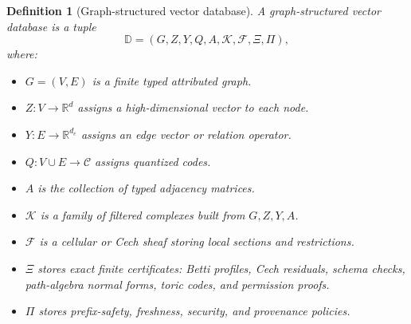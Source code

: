 \documentclass[11pt]{article}
\newtheorem{definition}[theorem]{Definition}
\newcommand{\RR}{\mathbb{R}}
\newcommand{\calK}{\mathcal{K}}
\newcommand{\calF}{\mathcal{F}}
\numberwithin{equation}{section}
\begin{document}
\begin{definition}[Graph-structured vector database]
A graph-structured vector database is a tuple
\begin{equation}
\mathbb{D}=(G,Z,Y,Q,A,\calK,\calF,\Xi,\Pi),
\end{equation}
where:
\begin{itemize}
\item $G=(V,E)$ is a finite typed attributed graph.
\item $Z:V\to\RR^d$ assigns a high-dimensional vector to each node.
\item $Y:E\to\RR^{d_e}$ assigns an edge vector or relation operator.
\item $Q:V\cup E\to\mathcal{C}$ assigns quantized codes.
\item $A$ is the collection of typed adjacency matrices.
\item $\calK$ is a family of filtered complexes built from $G,Z,Y,A$.
\item $\calF$ is a cellular or Cech sheaf storing local sections and restrictions.
\item $\Xi$ stores exact finite certificates: Betti profiles, Cech residuals, schema checks, path-algebra normal forms, toric codes, and permission proofs.
\item $\Pi$ stores prefix-safety, freshness, security, and provenance policies.
\end{itemize}
\end{definition}
\end{document}
